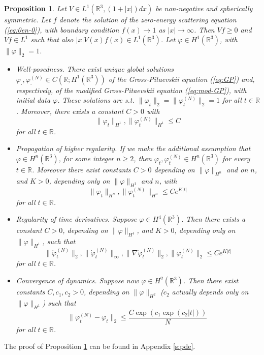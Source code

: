 \documentclass[11pt,a4paper]{article}
\newtheorem{proposition}[thm]{Proposition}
\newcommand{\bR}{{\mathbb R}}
\begin{document}
\begin{proposition} \label{t:pdes}
Let $V \in L^1 (\bR^3, (1+|x|) dx)$ be non-negative and spherically symmetric. Let $f$ denote the solution of the zero-energy scattering equation (\ref{eq:0en-0}), with boundary condition $f(x) \to 1$ as $|x| \to \infty$. Then $Vf \geq 0$ and $Vf \in L^1$ such that also $|x| V(x) f(x) \in L^1 (\bR^3)$. Let $\varphi \in H^1 (\bR^3)$, with $\| \varphi \|_2 = 1$.
\begin{itemize}
\item[(i)] Well-posedness. There exist unique global solutions $\varphi_. , \varphi_.^{(N)} \in C(\bR ; H^1 (\bR^3))$ of the Gross-Pitaevskii equation (\ref{eq:GP}) and, respectively, of the modified Gross-Pitaevskii equation (\ref{eq:mod-GP}), with initial data $\varphi$. These solutions are s.t. $\| \varphi_t \|_2 = \| \varphi_t^{(N)} \|_2 = 1$ for all $t \in \bR$. Moreover, there exists a constant $C > 0$ with 
\[  \| \varphi_t \|_{H^1} , \| \varphi_t^{(N)} \|_{H^1} \leq C \]
for all $t \in \bR$. 
\item[(ii)] Propagation of higher regularity. If we make the additional assumption that $\varphi \in H^n (\bR^3)$, for some integer $n \geq 2$, then $\varphi_t , \varphi_t^{(N)} \in H^n (\bR^3)$ for every $t \in \bR$. Moreover there exist constants $C>0$ depending on $\| \varphi \|_{H^n}$ and on $n$, and $K >0$, depending only on $\| \varphi \|_{H^1}$ and $n$, with
\begin{equation}\label{eq:hireg} \| \varphi_t \|_{H^n} , \| \varphi_t^{(N)} \|_{H^n} \leq C e^{K |t|} \end{equation}
for all $t \in \bR$. 
\item[(iii)] Regularity of time derivatives. Suppose $\varphi \in H^4 (\bR^3)$. Then there exists a constant $C>0$, depending on $\| \varphi \|_{H^4}$,  and $K > 0$, depending only on $\| \varphi \|_{H^1}$, such that
\[  \|\dot{\varphi}_t^{(N)} \|_2 , \| \dot{\varphi}_t^{(N)} \|_\infty , \| \nabla \dot{\varphi}_t^{(N)} \|_2 , \| \ddot{\varphi}_t^{(N)} \|_2 \leq C e^{K |t|} \]
for all $t \in \bR$.
\item[(iv)] Convergence of dynamics. Suppose now $\varphi \in H^2 (\bR^3)$. Then there exist constants $C,c_1,c_2 > 0$, depending on $\| \varphi \|_{H^2}$ ($c_2$ actually depends only on $\| \varphi \|_{H^1}$) such that 
\[ \| \varphi_t^{(N)} - \varphi_t \|_2 \leq \frac{C \exp (c_1 \exp (c_2 |t|))}{N} \,  \]
for all $t \in \bR$.
\end{itemize}
\end{proposition} 
The proof of Proposition \ref{t:pdes} can be found in Appendix \ref{s:pde}. 
\end{document}
